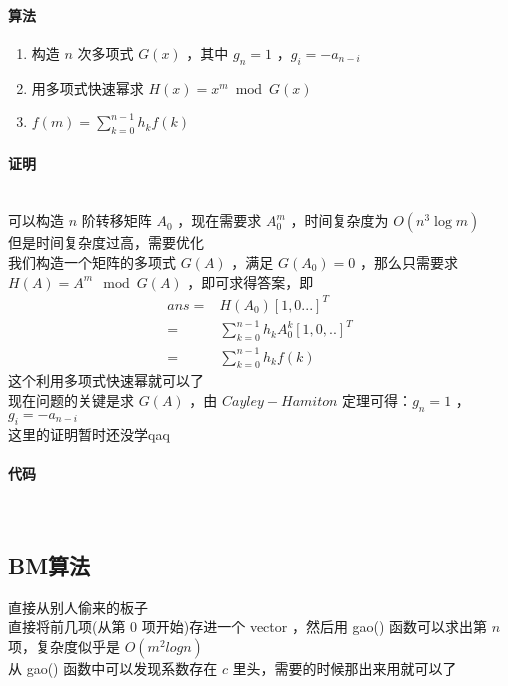 	\paragraph{算法}
	\begin{enumerate}
		\item 构造 $n$ 次多项式 $G(x)$ ，其中 $g_n=1$ ，$g_i=-a_{n-i}$
		\item 用多项式快速幂求 $H(x)=x^m \bmod{G(x)}$
		\item $\displaystyle f(m)=\sum_{k=0}^{n-1}h_kf(k)$
	\end{enumerate}
	\paragraph{证明}~\\
	可以构造 $n$ 阶转移矩阵 $A_0$ ，现在需要求 $A_0^m$  ，时间复杂度为 $O(n^3\log m)$\\
	但是时间复杂度过高，需要优化\\
	我们构造一个矩阵的多项式 $G(A)$ ，满足 $G(A_0)=0$ ，那么只需要求 $H(A)=A^m\mod{G(A)}$ ，即可求得答案，即
	$$
	\begin{aligned}
	ans=&H(A_0)[1,0...]^T
	\\=&\sum_{k=0}^{n-1}h_kA_0^k[1,0,..]^T
	\\=&\sum_{k=0}^{n-1}h_kf(k)
	\end{aligned}
	$$
	这个利用多项式快速幂就可以了\\
	现在问题的关键是求 $G(A)$ ，由 $Cayley-Hamiton$ 定理可得：$g_n=1$ ，$g_i=-a_{n-i}$\\
	这里的证明暂时还没学qaq\\
	\paragraph{代码}~\\
	
	\newpage
	\subsection{BM算法}
	直接从别人偷来的板子\\
	直接将前几项(从第 0 项开始)存进一个 vector ，然后用 gao() 函数可以求出第 $n$ 项，复杂度似乎是 $O(m^2logn)$\\
	从 gao() 函数中可以发现系数存在 $c$ 里头，需要的时候那出来用就可以了\\
	
%	
%